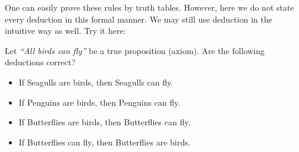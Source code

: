One can easily prove these rules by truth tables.
However, here we do not state every deduction in this formal manner. We may still use deduction in the intuitive way as well. Try it here:

\begin{exercise}{}
Let \emph{``All birds can fly''} be a true proposition (axiom). 
Are the following deductions correct?
 			\begin{itemize}
 				\item If Seagulls are birds, then Seagulls can fly.
 				\item If Penguins are birds, then Penguins can fly.
 				\item If Butterflies are birds, then Butterflies can fly.
 				\item If Butterflies can fly, then Butterflies are birds.
			\end{itemize} 			 
\end{exercise}
